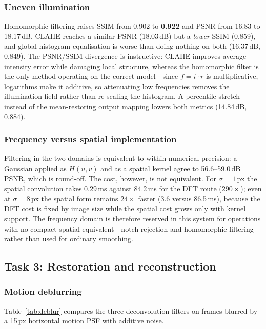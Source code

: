 \documentclass[conference,10pt]{IEEEtran}
\begin{document}
\subsubsection{Uneven illumination}
Homomorphic filtering raises SSIM from 0.902 to \textbf{0.922} and PSNR from
16.83 to 18.17\,dB. CLAHE reaches a similar PSNR (18.03\,dB) but a \emph{lower}
SSIM (0.859), and global histogram equalisation is worse than doing nothing on
both (16.37\,dB, 0.849). The PSNR/SSIM divergence is instructive: CLAHE
improves average intensity error while damaging local structure, whereas the
homomorphic filter is the only method operating on the correct model---since
$f = i\cdot r$ is multiplicative, logarithms make it additive, so attenuating
low frequencies removes the illumination field rather than re-scaling the
histogram. A percentile stretch instead of the mean-restoring output mapping
lowers both metrics (14.84\,dB, 0.884).

\subsubsection{Frequency versus spatial implementation}
Filtering in the two domains is equivalent to within numerical precision: a
Gaussian applied as $H(u,v)$ and as a spatial kernel agree to 56.6--59.0\,dB
PSNR, which is round-off. The cost, however, is not equivalent. For
$\sigma{=}1$\,px the spatial convolution takes 0.29\,ms against 84.2\,ms for
the DFT route ($290\times$); even at $\sigma{=}8$\,px the spatial form remains
$24\times$ faster (3.6 versus 86.5\,ms), because the DFT cost is fixed by image
size while the spatial cost grows only with kernel support. The frequency
domain is therefore reserved in this system for operations with no compact
spatial equivalent---notch rejection and homomorphic filtering---rather than
used for ordinary smoothing.

\subsection{Task 3: Restoration and reconstruction}\label{sec:res-rest}
\subsubsection{Motion deblurring}
Table~\ref{tab:deblur} compares the three deconvolution filters on frames
blurred by a 15\,px horizontal motion PSF with additive noise.
\end{document}
